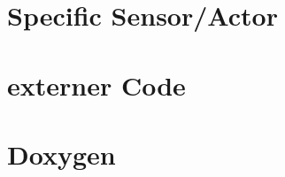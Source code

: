 \section{Specific Sensor/Actor}
%	
%	
%	
%	
%	


\section{externer Code }



\section{Doxygen}
%

%

